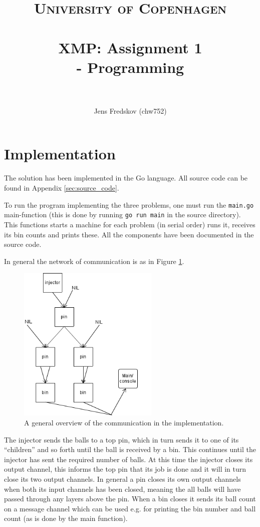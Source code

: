 \documentclass[a4paper, 11pt]{article}
\title{ 
\normalfont \normalsize 
\textsc{University of Copenhagen} \\ [25pt]
\horrule{0.5pt} \\[0.4cm]
\huge XMP: Assignment 1 \\ \Large - Programming \\
\horrule{2pt} \\[0.5cm]
}
\author{Jens Fredskov (chw752)}
\begin{document}
\maketitle
\pagebreak

\section{Implementation} %
\label{sec:implementation}

The solution has been implemented in the Go language. All source code can be found in Appendix \ref{sec:source_code}.

To run the program implementing the three problems, one must run the \texttt{main.go} main-function (this is done by running \texttt{go run main} in the source directory). This functions starts a machine for each problem (in serial order) runs it, receives its bin counts and prints these. All the components have been documented in the source code.

In general the network of communication is as in Figure \ref{fig:network}.

\begin{figure}[H]
  \centering
  \includegraphics[width=0.6\textwidth]{network.png}
  \caption{A general overview of the communication in the implementation.}
  \label{fig:network}
\end{figure}

The injector sends the balls to a top pin, which in turn sends it to one of its ``children'' and so forth until the ball is received by a bin. This continues until the injector has sent the required number of balls. At this time the injector closes its output channel, this informs the top pin that its job is done and it will in turn close its two output channels. In general a pin closes its own output channels when both its input channels has been closed, meaning the all balls will have passed through any layers above the pin. When a bin closes it sends its ball count on a message channel which can be used e.g. for printing the bin number and ball count (as is done by the main function).
\end{document}
